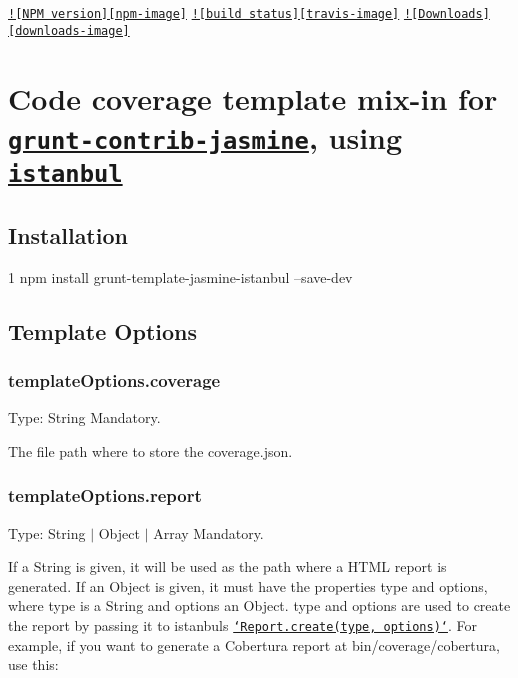 \href{https://npmjs.org/package/grunt-template-jasmine-istanbul}{\tt !\mbox{[}N\+P\+M version\mbox{]}\mbox{[}npm-\/image\mbox{]}} \href{https://travis-ci.org/maenu/grunt-template-jasmine-istanbul}{\tt !\mbox{[}build status\mbox{]}\mbox{[}travis-\/image\mbox{]}} \href{https://npmjs.org/package/grunt-template-jasmine-istanbul}{\tt !\mbox{[}Downloads\mbox{]}\mbox{[}downloads-\/image\mbox{]}}

\section*{Code coverage template mix-\/in for \href{https://github.com/gruntjs/grunt-contrib-jasmine}{\tt grunt-\/contrib-\/jasmine}, using \href{https://github.com/gotwarlost/istanbul}{\tt istanbul}}

\subsection*{Installation}


\begin{DoxyCode}
1 npm install grunt-template-jasmine-istanbul --save-dev
\end{DoxyCode}


\subsection*{Template Options}

\subsubsection*{template\+Options.\+coverage}

Type\+: {\ttfamily String} Mandatory.

The file path where to store the {\ttfamily coverage.\+json}.

\subsubsection*{template\+Options.\+report}

Type\+: {\ttfamily String $\vert$ Object $\vert$ Array} Mandatory.

If a {\ttfamily String} is given, it will be used as the path where a H\+T\+M\+L report is generated. If an {\ttfamily Object} is given, it must have the properties {\ttfamily type} and {\ttfamily options}, where {\ttfamily type} is a {\ttfamily String} and {\ttfamily options} an {\ttfamily Object}. {\ttfamily type} and {\ttfamily options} are used to create the report by passing it to {\ttfamily istanbul}s \href{http://gotwarlost.github.com/istanbul/public/apidocs/classes/Report.html}{\tt `\+Report.create(type, options)`}. For example, if you want to generate a Cobertura report at {\ttfamily bin/coverage/cobertura}, use this\+:


